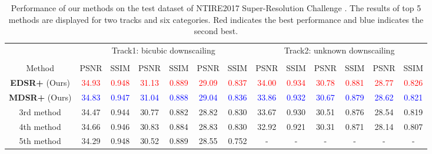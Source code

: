 \documentclass[10pt,twocolumn,letterpaper]{article}
\begin{document}
\begin{table}[t]
	\begin{table*}[h]
		{\footnotesize
			\setlength\tabcolsep{8pt}
			\renewcommand{\arraystretch}{1.3}
			\begin{center}
				\begin{tabular}{c*{6}{c}*{6}{c}}
					\hline
					& \multicolumn{6}{c}{Track1: bicubic downscailing} 
					& \multicolumn{6}{c}{Track2: unknown downscailing} \\
					& \multicolumn{2}{c}{}
					& \multicolumn{2}{c}{} 
					& \multicolumn{2}{c}{} 
					& \multicolumn{2}{c}{} 
					& \multicolumn{2}{c}{} 
					& \multicolumn{2}{c}{} \\
					Method &
					PSNR & SSIM & PSNR & SSIM & PSNR & SSIM & PSNR & SSIM &	PSNR & SSIM & PSNR & SSIM \\
					\hline
					\textbf{EDSR+} (Ours) &
					\textcolor{red}{34.93} & \textcolor{red}{0.948} &
					\textcolor{red}{31.13} & \textcolor{red}{0.889} &
					\textcolor{red}{29.09} & \textcolor{red}{0.837} &
					\textcolor{red}{34.00} & \textcolor{red}{0.934} &
					\textcolor{red}{30.78} & \textcolor{red}{0.881} &
					\textcolor{red}{28.77} & \textcolor{red}{0.826} \\
					\textbf{MDSR+} (Ours) &
					\textcolor{blue}{34.83} & \textcolor{blue}{0.947} &
					\textcolor{blue}{31.04} & \textcolor{blue}{0.888} &
					\textcolor{blue}{29.04} & \textcolor{blue}{0.836} &
					\textcolor{blue}{33.86} & \textcolor{blue}{0.932} &
					\textcolor{blue}{30.67} & \textcolor{blue}{0.879} &
					\textcolor{blue}{28.62} & \textcolor{blue}{0.821} \\
					3rd method &
					{34.47} & {0.944} &
					{30.77} & {0.882} &
					{28.82} & {0.830} &
					{33.67} & {0.930} &
					{30.51} & {0.876} &
					{28.54} & {0.819} \\
					4th method &
					{34.66} & {0.946} &
					{30.83} & {0.884} &
					{28.83} & {0.830} &
					{32.92} & {0.921} &
					{30.31} & {0.871} &
					{28.14} & {0.807} \\
					5th method &
					{34.29} & {0.948} &
					{30.52} & {0.889} &
					{28.55} & {0.752} &
					{-} & {-} &
					{-} & {-} &
					{-} & {-} \\
					\hline
				\end{tabular}
			\end{center}
		}
		\captionsetup{justification=raggedright,singlelinecheck=false}
		\caption{Performance of our methods on the test dataset of NTIRE2017 Super-Resolution Challenge  \cite{Timofte_2017_CVPR_Workshops}. The results of top 5 methods are displayed for two tracks and six categories. Red indicates the best performance and blue indicates the second best. 
		}
		\label{table_ntire_result}
	\end{table*}
	

\end{table}
\end{document}
